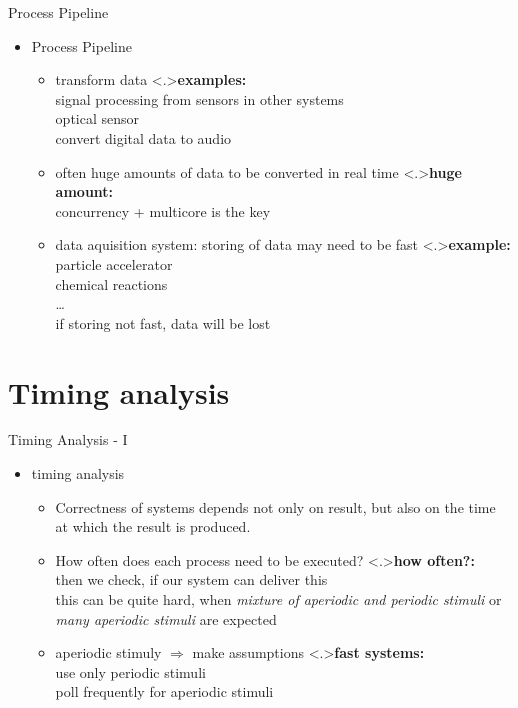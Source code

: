 \documentclass[ngerman={babel}, utf8, bigger, t, xcolor={table,dvipsnames}, ompress, hyperref={bookmarks,colorlinks}]{beamer}
\begin{document}
\begin{frame}{Process Pipeline}
	\begin{itemize}
		\item Process Pipeline
		\begin{itemize}
			\item transform data
			\note<.>{\textbf{examples:}\\ signal processing from sensors in other systems \\ optical sensor \\ convert digital data to audio}
			\item often huge amounts of data to be converted in real time
			\note<.>{\textbf{huge amount:}\\ concurrency + multicore is the key}
			\item data aquisition system: storing of data may need to be fast
			\note<.>{\textbf{example:}\\ particle accelerator \\ chemical reactions \\ \dots \\ if storing not fast, data will be lost}
		\end{itemize}
	\end{itemize}
\end{frame}

\section{Timing analysis}
\begin{frame}{Timing Analysis - I}
	\begin{itemize}
		\item timing analysis
		\begin{itemize}
			\item Correctness of systems depends not only on result, but also on the time at which the result is produced.
			\item How often does each process need to be executed?
			\note<.>{\textbf{how often?:}\\ then we check, if our system can deliver this \\ this can be quite hard, when \emph{mixture of aperiodic and periodic stimuli} or \emph{many aperiodic stimuli} are expected}
			\item aperiodic stimuly $\Rightarrow$ make assumptions
			\note<.>{\textbf{fast systems:}\\ use only periodic stimuli \\ poll frequently for aperiodic stimuli}
		\end{itemize}
	\end{itemize}
\end{frame}
\end{document}
